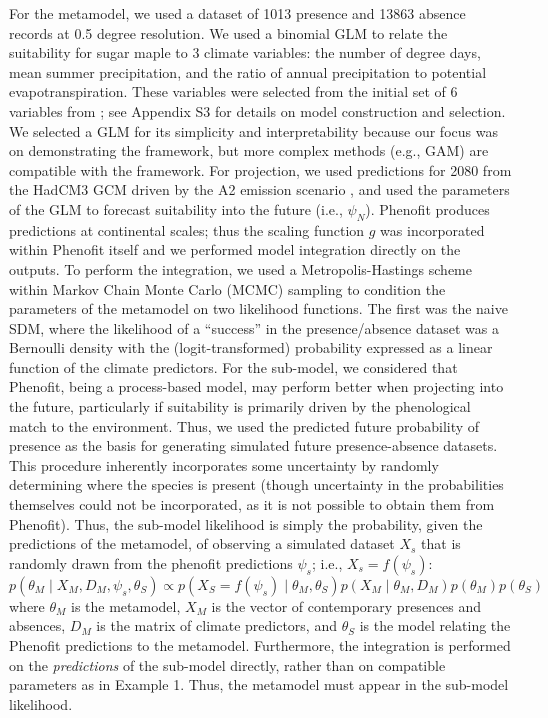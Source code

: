 \documentclass[11pt]{article}
\begin{document}
For the metamodel, we used a dataset of 1013 presence and 13863 absence records at 0.5 degree resolution.
We used a binomial GLM to relate the suitability for sugar maple to 3 climate variables: the number of degree days, mean summer precipitation, and the ratio of annual precipitation to potential evapotranspiration.
These variables were selected from the initial set of 6 variables from \citet{Morin2009}; see Appendix S3 for details on model construction and selection.
We selected a GLM for its simplicity and interpretability because our focus was on demonstrating the framework, but more complex methods (e.g., GAM) are compatible with the framework.
For projection, we used predictions for 2080 from the HadCM3 GCM \citep{Pope2000} driven by the A2 emission scenario \citep{Nakicenovic2000}, and used the parameters of the GLM to forecast suitability into the future (i.e., \(\psi_N\)).
Phenofit produces predictions at continental scales; thus the scaling function \(g\) was incorporated within Phenofit itself and we performed model integration directly on the outputs.
To perform the integration, we used a Metropolis-Hastings scheme within Markov Chain Monte Carlo (MCMC) sampling to condition the parameters of the metamodel on two likelihood functions.
The first was the naive SDM, where the likelihood of a ``success'' in the presence/absence dataset was a Bernoulli density with the (logit-transformed) probability expressed as a linear function of the climate predictors.
For the sub-model, we considered that Phenofit, being a process-based model, may perform better when projecting into the future, particularly if suitability is primarily driven by the phenological match to the environment.
Thus, we used the predicted future probability of presence as the basis for generating simulated future presence-absence datasets.
This procedure inherently incorporates some uncertainty by randomly determining where the species is present (though uncertainty in the probabilities themselves could not be incorporated, as it is not possible to obtain them from Phenofit).
Thus, the sub-model likelihood is simply the probability, given the predictions of the metamodel, of observing a simulated dataset \(X_s\) that is randomly drawn from the phenofit predictions \(\psi_s\); i.e., \(X_s = f(\psi_s)\):
\begin{equation}
\label{eq:integrated2}
	p( \theta_M \mid X_M, D_M, \psi_s, \theta_S )
	\propto 
	p( X_S = f(\psi_s)\mid \theta_M, \theta_S )
	p( X_M \mid \theta_M, D_M ) 
	p( \theta_M )
	p( \theta_S )
\end{equation}
where \(\theta_M\) is the metamodel, 
\(X_M\) is the vector of contemporary presences and absences, 
\(D_M\) is the matrix of climate predictors,
and \(\theta_S\) is the model relating the Phenofit predictions to the metamodel.
Furthermore, the integration is performed on the \emph{predictions} of the sub-model directly, rather than on compatible parameters as in Example 1. 
Thus, the metamodel must appear in the sub-model likelihood.
\end{document}
